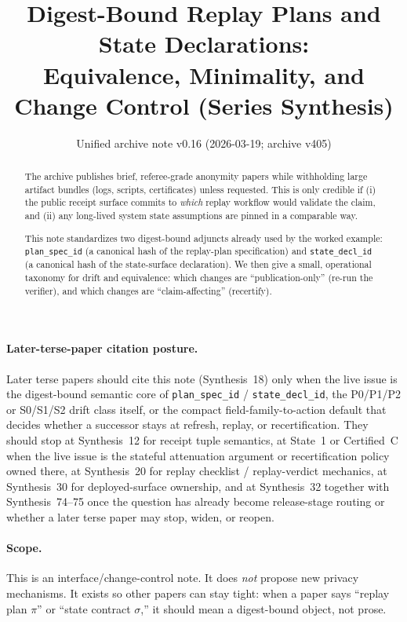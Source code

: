\documentclass[11pt]{article}
\title{Digest-Bound Replay Plans and State Declarations:\\
\large Equivalence, Minimality, and Change Control (Series Synthesis)}
\author{}
\date{Unified archive note v0.16 (2026-03-19; archive v405)}
\begin{document}
\maketitle

\begin{abstract}
The archive publishes brief, referee-grade anonymity papers while withholding large artifact bundles (logs, scripts, certificates) unless requested.
This is only credible if (i) the public receipt surface commits to \emph{which} replay workflow would validate the claim, and (ii) any long-lived system state assumptions are pinned in a comparable way.

This note standardizes two digest-bound adjuncts already used by the worked example:
\texttt{plan\_spec\_id} (a canonical hash of the replay-plan specification) and \texttt{state\_decl\_id} (a canonical hash of the state-surface declaration).
We then give a small, operational taxonomy for drift and equivalence:
which changes are ``publication-only'' (re-run the verifier), and which changes are ``claim-affecting'' (recertify).
\end{abstract}

\paragraph{Later-terse-paper citation posture.}
Later terse papers should cite this note (Synthesis~18) only when the live issue is the digest-bound semantic core of \texttt{plan\_spec\_id} / \texttt{state\_decl\_id}, the P0/P1/P2 or S0/S1/S2 drift class itself, or the compact field-family-to-action default that decides whether a successor stays at refresh, replay, or recertification.
They should stop at Synthesis~12 for receipt tuple semantics, at State~1 or Certified~C when the live issue is the stateful attenuation argument or recertification policy owned there, at Synthesis~20 for replay checklist / replay-verdict mechanics, at Synthesis~30 for deployed-surface ownership, and at Synthesis~32 together with Synthesis~74--75 once the question has already become release-stage routing or whether a later terse paper may stop, widen, or reopen.

\paragraph{Scope.}
This is an interface/change-control note.
It does \emph{not} propose new privacy mechanisms.
It exists so other papers can stay tight:
when a paper says ``replay plan $\pi$'' or ``state contract $\sigma$,'' it should mean a digest-bound object, not prose.
\end{document}
